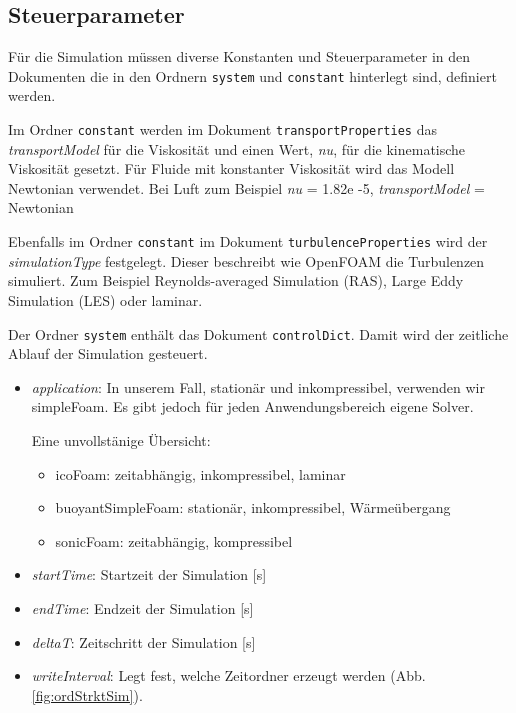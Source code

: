 \subsection{Steuerparameter \label{openfoam:section:Steuerparameter}}
Für die Simulation müssen diverse Konstanten und Steuerparameter in den Dokumenten die in den Ordnern \texttt{system} und \texttt{constant} hinterlegt sind, definiert werden.

Im Ordner \texttt{constant} werden im Dokument \texttt{transportProperties} das \textit{transportModel} für die Viskosität und einen Wert, \textit{nu}, für die kinematische Viskosität gesetzt.
%
Für Fluide mit konstanter Viskosität wird das Modell Newtonian verwendet. Bei Luft zum Beispiel \textit{nu} = 1.82e -5, \textit{transportModel} = Newtonian
%

Ebenfalls im Ordner \texttt{constant} im Dokument \texttt{turbulenceProperties} wird der \textit{simulationType} festgelegt. Dieser beschreibt wie OpenFOAM die Turbulenzen simuliert.
Zum Beispiel Reynolds-averaged Simulation (RAS), Large Eddy Simulation (LES) oder laminar.

Der Ordner \texttt{system} enthält das Dokument \texttt{controlDict}. Damit wird der zeitliche Ablauf der Simulation gesteuert.

\begin{itemize}
    \item \textit{application}: In unserem Fall, stationär und inkompressibel, 
%
    verwenden wir simpleFoam. Es gibt jedoch für jeden Anwendungsbereich eigene Solver.

    Eine unvollstänige Übersicht:
    \begin{itemize}
        \item icoFoam: zeitabhängig, inkompressibel, laminar
        \item buoyantSimpleFoam: stationär, inkompressibel, Wärmeübergang
        \item sonicFoam: zeitabhängig, kompressibel
    \end{itemize}
    \item \textit{startTime}: Startzeit der Simulation [s]
%
    \item \textit{endTime}: Endzeit der Simulation [s]
%
    \item \textit{deltaT}: Zeitschritt der Simulation [s]
%
    \item \textit{writeInterval}: Legt fest, welche Zeitordner erzeugt werden (Abb. \ref{fig:ordStrktSim}).
%
\end{itemize}

